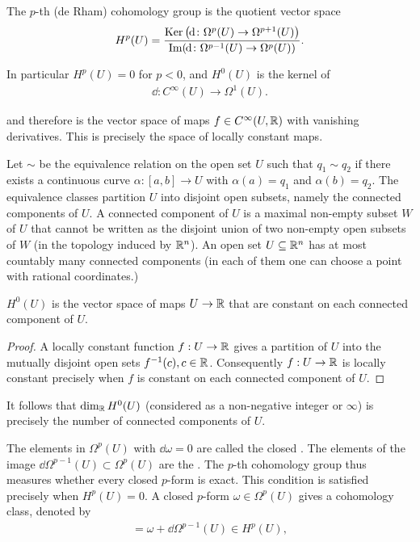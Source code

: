 \begin{definition}\label{definition:3-8}
The $p$-th (de Rham) cohomology group is the quotient vector space
\begin{align*}
  H^p(U) 
  = \frac {\ker\big(\!\dd\colon\Omega^p(U)\to\Omega^{p+1}(U)\big)}
          {\im(\!\dd\colon\Omega^{p-1}(U)\to\Omega^p(U))}.
\end{align*}

In particular $H^p(U) = 0$ for $p<0$, and $H^0(U)$ is the kernel of
\begin{align*}
  \dd:C^\infty(U)\to\Omega^1(U).
\end{align*}

and therefore is the vector space of maps $f\in C^\infty(U, {\mathbb{R}})$ with vanishing 
derivatives. This is precisely the space of locally constant maps.

Let $\sim$ be the equivalence relation on the open set $U$ such that $q_1\sim q_2$ if there
exists a continuous curve $\alpha: [a, b]\to U$ with $\alpha(a) = q_1$ and $\alpha(b) = q_2$. The
equivalence classes partition $U$ into disjoint open subsets, namely the connected components of $U$. 
A connected component of $U$ is a maximal non-empty subset $W$ of $U$ that cannot be written as the 
disjoint union of two non-empty open subsets of $W$ (in the topology induced by ${\mathbb{R}}^n$). An open 
set $U\subseteq{\ensuremath{\mathbb{R}}}^n$ has at most countably many connected components (in each of them one can choose 
a point with rational coordinates.)
\end{definition}



\begin{lemma}\label{lemma:3-9}
  $H^0(U)$ is the vector space of maps $U\to {\ensuremath{\mathbb{R}}}$ that are constant on each
connected component of $U$.
\end{lemma}

\begin{proof}
  A locally constant function $f:U\to{\ensuremath{\mathbb{R}}}$ gives a partition of $U$ into the
mutually disjoint open sets $f^{-1}(c), c\in{\ensuremath{\mathbb{R}}}$. Consequently $f:U\to{\ensuremath{\mathbb{R}}}$ is locally
constant precisely when $f$ is constant on each connected component of $U$.
\end{proof}

It follows that $\dim_{{\mathbb{R}}} H^0(U)$ (considered as a non-negative integer or $\infty$) is precisely
the number of connected components of $U$.


The elements in $\Omega^p(U)$ with $\dd\omega = 0$ are called the closed . The elements
of the image $\dd\Omega^{p-1}(U)\subset\Omega^p(U)$ are the . The $p$-th cohomology
group thus measures whether every closed $p$-form is exact. This condition is
satisfied precisely when $H^p(U) = 0$. A closed $p$-form $\omega\in\Omega^p(U)$ gives a
cohomology class, denoted by
\begin{align*}
  [\omega] = \omega + \dd\Omega^{p-1}(U) \in H^p(U),
\end{align*}

